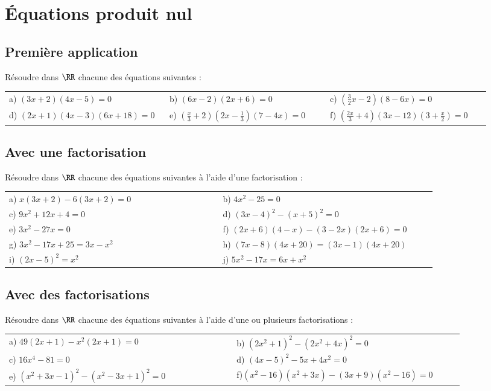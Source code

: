 \documentclass[oneside,12pt]{article}          %
\begin{document}
\section{Équations produit nul}

\subsection{Première application}
Résoudre dans $\RR$ chacune des équations suivantes :

\begin{tabular}{p{0.32\linewidth} p{0.32\linewidth} p{0.32\linewidth}}
	a) $(3x+2)(4x-5)=0$ & b) $(6x-2)(2x+6)=0$ & c) $\left(\frac{3}{2}x-2\right)(8-6x)=0$ \\
	d) $(2x+1)(4x-3)(6x+18)=0$ & e) $\left(\frac{x}{3}+2\right)\left(2x-\frac{1}{3}\right)(7-4x)=0$ & f) $\left(\frac{2x}{3}+4\right)(3x-12)\left(3+\frac{x}{2}\right)=0$
\end{tabular}



\subsection{Avec une factorisation}
Résoudre dans $\RR$ chacune des équations suivantes à l'aide d'une factorisation :

\begin{tabular}{p{0.45\linewidth} p{0.45\linewidth}}
	a) $x(3x+2)-6(3x+2)=0$ & b) $4x^2-25=0$ \\
	c) $9x^2+12x+4=0$ & d) $(3x-4)^2-(x+5)^2=0$ \\
	e) $3x^2-27x=0$ & f) $(2x+6)(4-x)-(3-2x)(2x+6)=0$ \\
	g) $3x^2-17x+25=3x-x^2$ & h) $(7x-8)(4x+20)=(3x-1)(4x+20)$ \\
	i) $(2x-5)^2=x^2$ & j) $5x^2-17x=6x+x^2$
\end{tabular}



\newpage
\subsection{Avec des factorisations}
Résoudre dans $\RR$ chacune des équations suivantes à l'aide d'une ou plusieurs factorisations :

\begin{tabular}{p{0.45\linewidth} p{0.45\linewidth}}
	a) $49(2x+1)-x^2(2x+1)=0$ & b) $(2x^2+1)^2-(2x^2+4x)^2=0$ \\
	c) $16x^4-81=0$ & d) $(4x-5)^2-5x+4x^2=0$ \\
	e) $(x^2+3x-1)^2-(x^2-3x+1)^2=0$ & f)$(x^2-16)(x^2+3x)-(3x+9)(x^2-16)=0$
\end{tabular}
\end{document}
